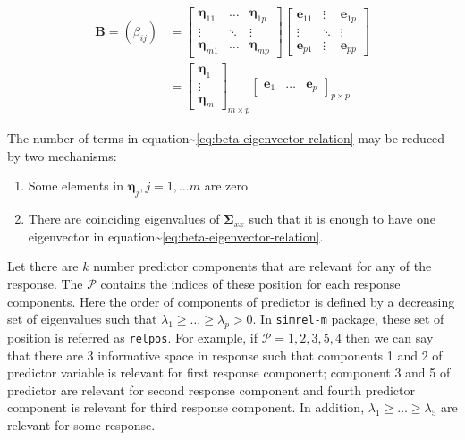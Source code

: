 \documentclass[12pt,A4paper,authoryear]{elsarticle} %
\providecommand{\tightlist}{%
  \setlength{\itemsep}{0pt}\setlength{\parskip}{0pt}}
\begin{document}
\begin{align}
\mathbf{B} = \left(\beta_{ij}\right) &= 
  \begin{bmatrix} 
    \boldsymbol{\eta}_{11} & \ldots & \boldsymbol{\eta}_{1p} \\
    \vdots & \ddots & \vdots \\
    \boldsymbol{\eta}_{m1} & \ldots & \boldsymbol{\eta}_{mp}
  \end{bmatrix} 
  \begin{bmatrix} 
    \mathbf{e}_{11} & \vdots & \mathbf{e}_{1p} \\
    \vdots & \ddots & \vdots \\
    \mathbf{e}_{p1} & \vdots & \mathbf{e}_{pp}
  \end{bmatrix} \\ &= 
  \begin{bmatrix}\boldsymbol{\eta}_{1} \\ \vdots \\ \boldsymbol{\eta}_{m}\end{bmatrix}_{m \times p}
  \begin{bmatrix}\mathbf{e}_{1} & \ldots & \mathbf{e}_{p}\end{bmatrix}_{p \times p} 
\label{eq:beta-eigenvector-relation}
\end{align}

The number of terms in
equation\textasciitilde{}\eqref{eq:beta-eigenvector-relation} may be
reduced by two mechanisms:

\begin{enumerate}
\def\labelenumi{\alph{enumi})}
\tightlist
\item
  Some elements in \(\boldsymbol{\eta}_j, j = 1, \ldots m\) are zero
\item
  There are coinciding eigenvalues of \(\boldsymbol{\Sigma}_{xx}\) such
  that it is enough to have one eigenvector in
  equation\textasciitilde{}\eqref{eq:beta-eigenvector-relation}.
\end{enumerate}

Let there are \(k\) number predictor components that are relevant for
any of the response. The \(\mathcal{P}\) contains the indices of these
position for each response components. Here the order of components of
predictor is defined by a decreasing set of eigenvalues such that
\(\lambda_1 \ge \ldots \ge \lambda_p > 0\). In \texttt{simrel-m}
package, these set of position is referred as \texttt{relpos}. For
example, if \(\mathcal{P} = {{1, 2}, {3, 5}, {4}}\) then we can say that
there are 3 informative space in response such that components 1 and 2
of predictor variable is relevant for first response component;
component 3 and 5 of predictor are relevant for second response
component and fourth predictor component is relevant for third response
component. In addition, \(\lambda_1 \ge \ldots \ge \lambda_5\) are
relevant for some response.
\end{document}
